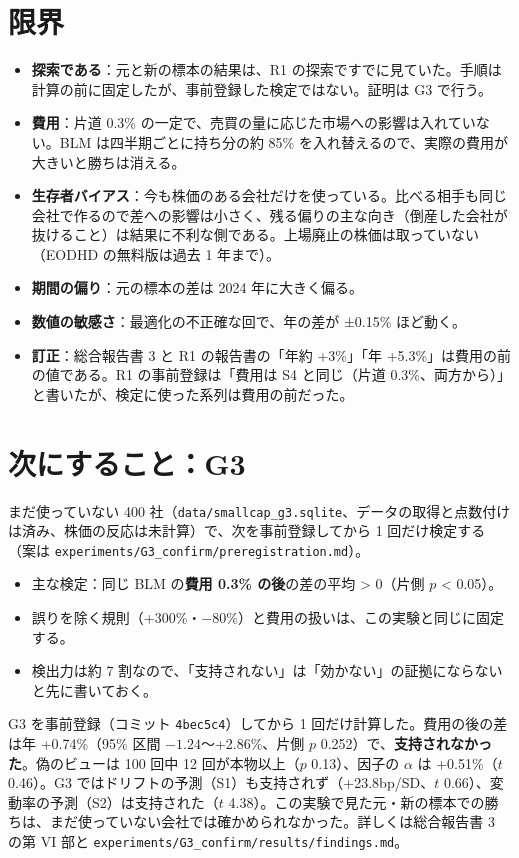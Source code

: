 \documentclass[xelatex,ja=standard,jafont=haranoaji,a4paper,10pt,openany]{bxjsreport}
\newcommand{\code}[1]{\texttt{#1}}
\begin{document}
\section{限界}

\begin{itemize}
\item \textbf{探索である}：元と新の標本の結果は、R1 の探索ですでに見ていた。手順は計算の前に固定したが、事前登録した検定ではない。証明は G3 で行う。
\item \textbf{費用}：片道 0.3\% の一定で、売買の量に応じた市場への影響は入れていない。BLM は四半期ごとに持ち分の約 85\% を入れ替えるので、実際の費用が大きいと勝ちは消える。
\item \textbf{生存者バイアス}：今も株価のある会社だけを使っている。比べる相手も同じ会社で作るので差への影響は小さく、残る偏りの主な向き（倒産した会社が抜けること）は結果に不利な側である。上場廃止の株価は取っていない（EODHD の無料版は過去 1 年まで）。
\item \textbf{期間の偏り}：元の標本の差は 2024 年に大きく偏る。
\item \textbf{数値の敏感さ}：最適化の不正確な回で、年の差が ±0.15\% ほど動く。
\item \textbf{訂正}：総合報告書 3 と R1 の報告書の「年約 +3\%」「年 +5.3\%」は費用の前の値である。R1 の事前登録は「費用は S4 と同じ（片道 0.3\%、両方から）」と書いたが、検定に使った系列は費用の前だった。
\end{itemize}

\section{次にすること：G3}

まだ使っていない 400 社（\code{data/smallcap\_g3.sqlite}、データの取得と点数付けは済み、株価の反応は未計算）で、次を事前登録してから 1 回だけ検定する（案は \code{experiments/G3\_confirm/preregistration.md}）。

\begin{itemize}
\item 主な検定：同じ BLM の\textbf{費用 0.3\% の後}の差の平均 > 0（片側 $p$ < 0.05）。
\item 誤りを除く規則（+300\%・$-80\%$）と費用の扱いは、この実験と同じに固定する。
\item 検出力は約 7 割なので、「支持されない」は「効かない」の証拠にならないと先に書いておく。
\end{itemize}

\begin{notebox}[追記（2026-10-27）：G3 の結果]
G3 を事前登録（コミット \code{4bec5c4}）してから 1 回だけ計算した。費用の後の差は年 +0.74\%（95\% 区間 $-1.24$〜+2.86\%、片側 $p$ 0.252）で、\textbf{支持されなかった}。偽のビューは 100 回中 12 回が本物以上（$p$ 0.13）、因子の $\alpha$ は +0.51\%（$t$ 0.46）。G3 ではドリフトの予測（S1）も支持されず（+23.8bp/SD、$t$ 0.66）、変動率の予測（S2）は支持された（$t$ 4.38）。この実験で見た元・新の標本での勝ちは、まだ使っていない会社では確かめられなかった。詳しくは総合報告書 3 の第 VI 部と \code{experiments/G3\_confirm/results/findings.md}。
\end{notebox}
\end{document}
